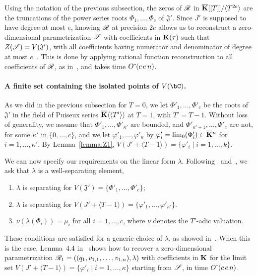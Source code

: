 \documentclass[12pt]{article}
\begin{document}
Using the notation of the previous subsection, the zeros of $\mathscr{R}$ in
$\overline{\mathbf{K}}[[T]]/\langle T^{2e}\rangle$ are the truncations of the power
series roots $\Phi_1,\dots,\Phi_c$ of $\mathfrak{J}'$. Since $J'$ is
supposed to have degree at most $e$, knowing $\mathscr{R}$ at precision $2e$
allows us to reconstruct a zero-dimensional parametrization $\mathscr{S}$
with coefficients in $\mathbf{K}(\tau)$ such that
$Z(\mathscr{S})=V(\mathfrak{J}')$, with all coefficients having numerator
and denominator of degree at most $e$~\cite[Theorem~1]{Schost03}.
This is done by applying rational function reconstruction to all
coefficients of $\mathscr{R}$, as in~\cite{Schost03}, and takes time
${O}{\,\tilde{ }\,}(c\,e\,n)$.


\paragraph{A finite set containing the isolated points of $V(\bC)$.}
As we did in the previous subsection for $T=0$, we let
$\Phi'_1,\dots,\Phi'_c$ be the roots of $\mathfrak{J}'$ in the field
of Puiseux series $\overline{\mathbf{K}}\langle\langle T'\rangle\rangle$ at $T=1$,
with $T'=T-1$. Without loss of generality, we assume that
$\Phi'_1,\dots,\Phi'_{\kappa'}$ are bounded, and
$\Phi'_{\kappa'+1},\dots,\Phi'_c$ are not, for some $\kappa'$ in
$\{0,\dots,c\}$, and we let $\varphi'_1,\dots,\varphi'_\kappa$ by
$\varphi'_i=\lim_0(\Phi'_i)\in\overline{\mathbf{K}}{}^n$ for $i=1,\dots,\kappa'$.  By
Lemma~\ref{lemma:Z1}, $V(J' + \langle T-1\rangle) = \{ \varphi'_i \mid
i=1,\dots,k\}$.

We can now specify our requirements on the linear form $\lambda$.
Following~\cite{RRS} and~\cite{SaSc16}, we ask that $\lambda$ is a {\rm well-separating
  element},
\begin{enumerate}
\item $\lambda$ is separating for $V(\mathfrak{J}')=\{\Phi'_1,\dots,\Phi'_c\}$;
\item $\lambda$ is separating for $V(J' + \langle T-1\rangle) = \{ \varphi'_1,\dots,\varphi'_{\kappa'}\}$.
\item $\nu(\lambda(\Phi_i)) = \mu_i$ for all $i=1,\dots,c$, where $\nu$ denotes
 the $T'$-adic valuation.
\end{enumerate}
These conditions are satisfied for a generic choice of $\lambda$, as
showed in~\cite{SaSc16}. When this is the case, Lemma~4.4
in~\cite{RRS} shows how to recover a zero-dimensional parametrization
$\mathscr{R}_1=((q_1,v_{1,1},\dots,v_{1,n}),\lambda)$ with coefficients in
$\mathbf{K}$ for the limit set $V(J' + \langle T-1\rangle) =\{\varphi'_i \mid i=1,\dots,\kappa\}$
starting from $\mathscr{S}$, in time 
${O}{\,\tilde{ }\,}(c\,e\,n)$.
\end{document}
